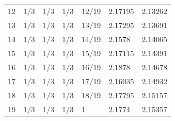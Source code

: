 \begin{tabular}{lllllll}
12 &   1/3 &   1/3 &   1/3 &  12/19 &                                            2.17195 &                                            2.13262 \\
13 &   1/3 &   1/3 &   1/3 &  13/19 &                                            2.17295 &                                            2.13691 \\
14 &   1/3 &   1/3 &   1/3 &  14/19 &                                             2.1578 &                                            2.14065 \\
15 &   1/3 &   1/3 &   1/3 &  15/19 &                                            2.17115 &                                            2.14391 \\
16 &   1/3 &   1/3 &   1/3 &  16/19 &                                             2.1878 &                                            2.14678 \\
17 &   1/3 &   1/3 &   1/3 &  17/19 &                                            2.16035 &                                            2.14932 \\
18 &   1/3 &   1/3 &   1/3 &  18/19 &                                            2.17795 &                                            2.15157 \\
19 &   1/3 &   1/3 &   1/3 &      1 &                                             2.1774 &                                            2.15357 \\
\bottomrule
\end{tabular}
